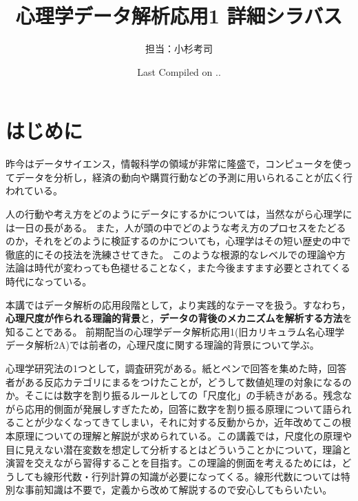 \documentclass[dvipsnames]{ltjsarticle}
\begin{document}
\title{心理学データ解析応用1 詳細シラバス}
\author{担当：小杉考司}
\date{Last Compiled on \number\year .\number\month .\number\day}
\maketitle
\setcounter{tocdepth}{1}
\tableofcontents
\newpage
\section*{はじめに}
昨今はデータサイエンス，情報科学の領域が非常に隆盛で，コンピュータを使ってデータを分析し，経済の動向や購買行動などの予測に用いられることが広く行われている。

人の行動や考え方をどのようにデータにするかについては，当然ながら心理学には一日の長がある。
また，人が頭の中でどのような考え方のプロセスをたどるのか，それをどのように検証するのかについても，心理学はその短い歴史の中で徹底的にその技法を洗練させてきた。
このような根源的なレベルでの理論や方法論は時代が変わっても色褪せることなく，また今後ますます必要とされてくる時代になっている。

本講ではデータ解析の応用段階として，より実践的なテーマを扱う。すなわち，\textbf{心理尺度が作られる理論的背景}と，\textbf{データの背後のメカニズムを解析する方法}を知ることである。
前期配当の心理学データ解析応用1(旧カリキュラム名心理学データ解析2A)では前者の，心理尺度に関する理論的背景について学ぶ。

心理学研究法の1つとして，調査研究がある。紙とペンで回答を集めた時，回答者がある反応カテゴリにまるをつけたことが，どうして数値処理の対象になるのか。そこには数字を割り振るルールとしての「尺度化」の手続きがある。残念ながら応用的側面が発展しすぎたため，回答に数字を割り振る原理について語られることが少なくなってきてしまい，それに対する反動からか，近年改めてこの根本原理についての理解と解説が求められている。この講義では，尺度化の原理や目に見えない潜在変数を想定して分析するとはどういうことかについて，理論と演習を交えながら習得することを目指す。この理論的側面を考えるためには，どうしても線形代数・行列計算の知識が必要になってくる。線形代数については特別な事前知識は不要で，定義から改めて解説するので安心してもらいたい。

\end{document}
